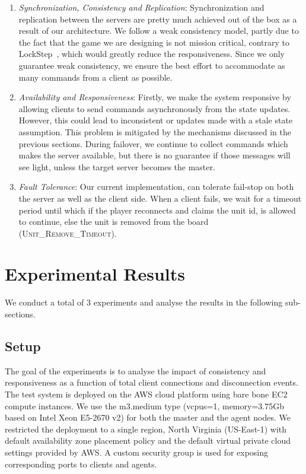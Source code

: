 \documentclass[a4paper]{IEEEtran}
\begin{document}
  \begin{enumerate}
    \item \emph{Synchronization, Consistency and Replication}: Synchronization and replication between the servers are pretty much achieved out of the box as a result of our architecture. We follow a weak consistency model, partly due to the fact that the game we are designing is not mission critical, contrary to LockStep~\cite{lockstep}, which would greatly reduce the responsiveness. Since we only guarantee weak consistency, we ensure the best effort to accommodate as many commands from a client as possible.

    \item \emph{Availability and Responsiveness}: Firstly, we make the system responsive by allowing clients to send commands asynchronously from the state updates. However, this could lead to inconsistent or updates made with a stale state assumption. This problem is mitigated by the mechanisms discussed in the previous sections. During failover, we continue to collect commands which makes the server available, but there is no guarantee if those messages will see light, unless the target server becomes the master.
  
    \item \emph{Fault Tolerance}: Our current implementation, can tolerate fail-stop on both the server as well as the client side. When a client fails, we wait for a timeout period until which if the player reconnects and claims the unit id, is allowed to continue, else the unit is removed from the board (\textsc{Unit\_Remove\_Timeout}).

  \end{enumerate}
  
  \section{Experimental Results} \label{experiments}
  
  We conduct a total of 3 experiments and analyse the results in the following sub-sections.
  
  \subsection{Setup}
  
  The goal of the experiments is to analyse the impact of consistency and responsiveness as a function of total client connections and disconnection events. The test system is deployed on the AWS cloud platform using bare bone EC2 compute instances. We use the m3.medium type (vcpus=1, memory=3.75Gb based on Intel Xeon E5-2670 v2) for both the master and the agent nodes. We restricted the deployment to a single region, North Virginia (US-East-1) with default availability zone placement policy and the default virtual private cloud settings provided by AWS. A custom security group is used for exposing corresponding ports to clients and agents.   
\end{document}

